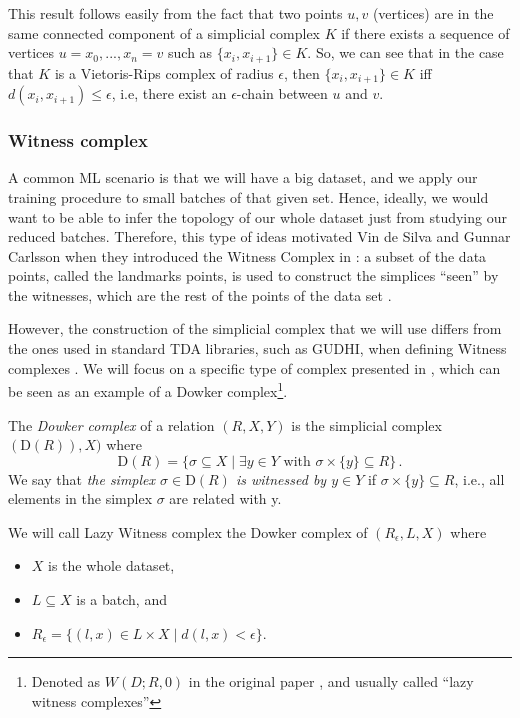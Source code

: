 \documentclass[../main.tex]{subfiles}
\begin{document}
This result follows easily from the fact that two points $u,v$ (vertices) are in the same connected component of a simplicial complex $K$ if there exists a sequence of vertices $u=x_0,..., x_n=v$ such as $\{x_i, x_{i+1}\} \in K$. So, we can see that in the case that $K$ is a Vietoris-Rips complex of radius $\epsilon$, then $\{x_i, x_{i+1}\} \in K$ iff $d(x_i, x_{i+1})\leq\epsilon$, i.e, there exist an $\epsilon$-chain between $u$ and $v$. 

\subsubsection*{Witness complex}

A common ML scenario is that we will have a big dataset, and we apply our training procedure to small batches of that given set. Hence, ideally, we would want to be able to infer the topology of our whole dataset just from studying our reduced batches. Therefore, this type of ideas motivated Vin de Silva and Gunnar Carlsson when they introduced the Witness Complex in \cite{silva_topological_2004}: a subset of the data points, called the landmarks points, is used to construct the simplices ``seen'' by the witnesses, which are the rest of the points of the data set \cite{medbouhi_towards_2022}.

However, the construction of the simplicial complex that we will use differs from the ones used in standard TDA libraries, such as GUDHI, when defining Witness complexes \cite{noauthor_gudhi_nodate}. We will focus on a specific type of complex presented in \cite{silva_topological_2004}, which can be seen as an example of a Dowker complex\footnote{Denoted as $W(D; R, 0)$ in the original paper \cite{silva_topological_2004}, and usually called ``lazy witness complexes''}.

\begin{definition}
The \emph{Dowker complex} of a relation $(R, X, Y)$ is the simplicial complex $(\text{D}(R)), X)$ where
\[
\text{D}(R) = \{\sigma \subseteq X \mid \exists y \in Y \text{ with } \sigma \times \{y\} \subseteq R\}\,.
\]
We say that \emph{the simplex $\sigma \in \text{D}(R)$ is witnessed by $y \in Y$} if $\sigma \times \{y\} \subseteq R$, i.e., all elements in the simplex $\sigma$ are related with y.
\end{definition}

We will call Lazy Witness complex the Dowker complex of $(R_\epsilon, L, X)$ where
\begin{itemize}
    \item $X$ is the whole dataset,
    \item $L\subseteq X$ is a batch, and
    \item $R_\epsilon=\{(l,x)\in L \times X \mid d(l,x)<\epsilon\}$. 
\end{itemize}
\end{document}
